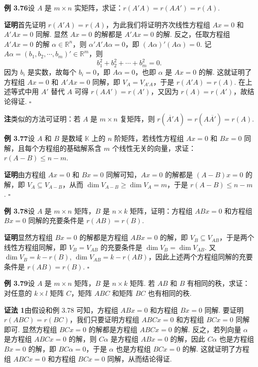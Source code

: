 \documentclass[UTF8,12pt,a4paper,fontset=fandol]{ctexart}
\begin{document}
\noindent\textbf{例 3.76}\quad 设 $A$ 是 $m\times n$ 实矩阵，求证：$r(A'A)=r(AA')=r(A)$.

\noindent\textbf{证明}\quad 首先证明 $r(A'A)=r(A)$，为此我们将证明齐次线性方程组 $Ax=0$ 和 $A'Ax=0$ 同解. 显然 $Ax=0$ 的解都是 $A'Ax=0$ 的解. 反之，任取方程组 $A'Ax=0$ 的解 $\alpha\in\mathbb{R}^n$，则 $\alpha'A'A\alpha=0$，即 $(A\alpha)'(A\alpha)=0$. 记 $A\alpha=(b_1,b_2,\cdots,b_m)'\in\mathbb{R}^m$，则
\[
b_1^2+b_2^2+\cdots+b_m^2=0.
\]
因为 $b_i$ 是实数，故每个 $b_i=0$，即 $A\alpha=0$，也即 $\alpha$ 是 $Ax=0$ 的解. 这就证明了方程组 $Ax=0$ 和 $A'Ax=0$ 同解，即 $V_A=V_{A'A}$，于是 $r(A'A)=r(A)$. 在上述等式中用 $A'$ 替代 $A$ 可得 $r(AA')=r(A')$，又因为 $r(A)=r(A')$，故结论得证. $\square$

\noindent\textbf{注}\quad 类似的方法可证明：若 $A$ 是 $m\times n$ 复矩阵，则 $r(\overline{A'}A)=r(A\overline{A'})=r(A)$.

\noindent\textbf{例 3.77}\quad 设 $A$ 和 $B$ 是数域 $\mathbb{K}$ 上的 $n$ 阶矩阵，若线性方程组 $Ax=0$ 和 $Bx=0$ 同解，且每个方程组的基础解系含 $m$ 个线性无关的向量，求证：$r(A-B)\le n-m$.

\noindent\textbf{证明}\quad 由方程组 $Ax=0$ 和 $Bx=0$ 同解可知，$Ax=0$ 的解都是 $(A-B)x=0$ 的解，即 $V_A\subseteq V_{A-B}$，从而 $\dim V_{A-B}\ge \dim V_A=m$，于是 $r(A-B)\le n-m$. $\square$

\noindent\textbf{例 3.78}\quad 设 $A$ 是 $m\times n$ 矩阵，$B$ 是 $n\times k$ 矩阵，证明：方程组 $ABx=0$ 和方程组 $Bx=0$ 同解的充要条件是 $r(AB)=r(B)$.

\noindent\textbf{证明}\quad 显然方程组 $Bx=0$ 的解都是方程组 $ABx=0$ 的解，即 $V_B\subseteq V_{AB}$，于是两个线性方程组同解，即 $V_B=V_{AB}$ 的充要条件是 $\dim V_B=\dim V_{AB}$. 又 $\dim V_B=k-r(B)$, $\dim V_{AB}=k-r(AB)$，因此上述两个方程组同解的充要条件是 $r(AB)=r(B)$. $\square$

\noindent\textbf{例 3.79}\quad 设 $A$ 是 $m\times n$ 矩阵，$B$ 是 $n\times k$ 矩阵. 若 $AB$ 和 $B$ 有相同的秩，求证：对任意的 $k\times l$ 矩阵 $C$，矩阵 $ABC$ 和矩阵 $BC$ 也有相同的秩.

\noindent\textbf{证法 1}\quad 由假设和例 3.78 可知，方程组 $ABx=0$ 和方程组 $Bx=0$ 同解. 要证明 $r(ABC)=r(BC)$，我们只要证明方程组 $ABCx=0$ 和方程组 $BCx=0$ 同解即可. 显然方程组 $BCx=0$ 的解都是方程组 $ABCx=0$ 的解. 反之，若列向量 $\alpha$ 是方程组 $ABCx=0$ 的解，则 $C\alpha$ 是方程组 $ABx=0$ 的解，因此 $C\alpha$ 也是方程组 $Bx=0$ 的解，即 $BC\alpha=0$，于是 $\alpha$ 也是方程组 $BCx=0$ 的解. 这就证明了方程组 $ABCx=0$ 和方程组 $BCx=0$ 同解，从而结论得证.
\end{document}
